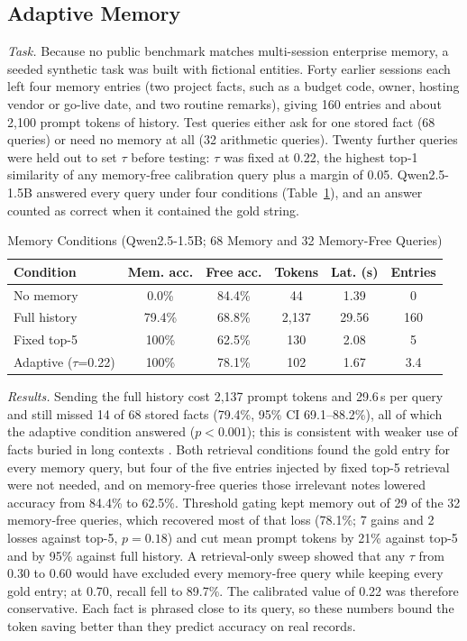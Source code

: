 \subsection{Adaptive Memory}
\textit{Task.} Because no public benchmark matches multi-session enterprise memory, a seeded synthetic task was built with fictional entities. Forty earlier sessions each left four memory entries (two project facts, such as a budget code, owner, hosting vendor or go-live date, and two routine remarks), giving 160 entries and about 2,100 prompt tokens of history. Test queries either ask for one stored fact (68 queries) or need no memory at all (32 arithmetic queries). Twenty further queries were held out to set $\tau$ before testing: $\tau$ was fixed at 0.22, the highest top-1 similarity of any memory-free calibration query plus a margin of 0.05. Qwen2.5-1.5B answered every query under four conditions (Table~\ref{tab:memory}), and an answer counted as correct when it contained the gold string.

\begin{table}[t]
\caption{Memory Conditions (Qwen2.5-1.5B; 68 Memory and 32 Memory-Free Queries)}
\label{tab:memory}
\centering
\footnotesize
\setlength{\tabcolsep}{3pt}
\begin{tabular}{@{}lccccc@{}}
\toprule
Condition & Mem. acc. & Free acc. & Tokens & Lat. (s) & Entries \\
\midrule
No memory & 0.0\% & 84.4\% & 44 & 1.39 & 0 \\
Full history & 79.4\% & 68.8\% & 2,137 & 29.56 & 160 \\
Fixed top-5 & 100\% & 62.5\% & 130 & 2.08 & 5 \\
Adaptive ($\tau$=0.22) & 100\% & 78.1\% & 102 & 1.67 & 3.4 \\
\bottomrule
\end{tabular}
\end{table}

\textit{Results.} Sending the full history cost 2,137 prompt tokens and 29.6\,s per query and still missed 14 of 68 stored facts (79.4\%, 95\% CI 69.1--88.2\%), all of which the adaptive condition answered ($p<0.001$); this is consistent with weaker use of facts buried in long contexts \cite{liu2024lost}. Both retrieval conditions found the gold entry for every memory query, but four of the five entries injected by fixed top-5 retrieval were not needed, and on memory-free queries those irrelevant notes lowered accuracy from 84.4\% to 62.5\%. Threshold gating kept memory out of 29 of the 32 memory-free queries, which recovered most of that loss (78.1\%; 7 gains and 2 losses against top-5, $p=0.18$) and cut mean prompt tokens by 21\% against top-5 and by 95\% against full history. A retrieval-only sweep showed that any $\tau$ from 0.30 to 0.60 would have excluded every memory-free query while keeping every gold entry; at 0.70, recall fell to 89.7\%. The calibrated value of 0.22 was therefore conservative. Each fact is phrased close to its query, so these numbers bound the token saving better than they predict accuracy on real records.
